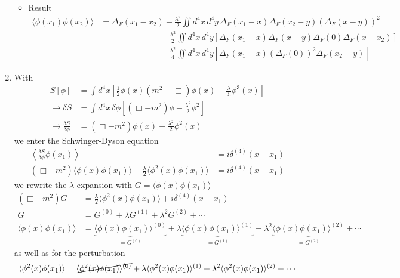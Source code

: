 \documentclass[10pt,a4paper]{article}
\theoremstyle{definition}
\begin{document}
\begin{enumerate}[1.]
\begin{itemize}
\item Result
\begin{align}
\langle\phi(x_1)\phi(x_2)\rangle&=
\Delta_F(x_1-x_2)
-\frac{\lambda^2}{2}\iint d^4x\,d^4y\,\Delta_F(x_1-x)\Delta_F(x_2-y)(\Delta_F(x-y))^2\\
&\qquad\qquad\qquad\quad- \frac{\lambda^2}{2}\iint d^4x\,d^4y \left[\Delta_F(x_1-x)\Delta_F(x-y)\Delta_F(0)\Delta_F(x-x_2)\right]\\
&\qquad\qquad\qquad\quad- \frac{\lambda^2}{4}\iint d^4x\,d^4y \left[\Delta_F(x_1-x)(\Delta_F(0))^2\Delta_F(x_2-y)\right]
\end{align}
\end{itemize}


\item With
\begin{align}
S[\phi] &= \int d^4x \left[ \frac{1}{2} \phi(x)(m^2-\Box)\phi(x) - \frac{\lambda}{3!} \phi^3(x) \right]\\
\rightarrow \delta S&=\int d^4x\,\delta\phi\left[(\Box-m^2)\phi-\frac{\lambda^2}{2}\phi^2\right]\\
\rightarrow \frac{\delta S}{\delta\phi}&=(\Box-m^2)\phi(x)-\frac{\lambda^2}{2}\phi^2(x)
\end{align}
we enter the Schwinger-Dyson equation
\begin{align}
\left<\frac{\delta S}{\delta\phi}\phi(x_1)\right>
&=i\delta^{(4)}(x-x_1)\\
(\Box-m^2)\langle\phi(x)\phi(x_1)\rangle-
\frac{\lambda}{2}\langle\phi^2(x)\phi(x_1)\rangle
&=i\delta^{(4)}(x-x_1)
\end{align}
we rewrite the $\lambda$ expansion with $G=\langle\phi(x)\phi(x_1)\rangle$
\begin{align}
(\Box-m^2)G&=
\frac{\lambda}{2}\langle\phi^2(x)\phi(x_1)\rangle
+i\delta^{(4)}(x-x_1)\\
G 
&= G^{(0)} + \lambda G^{(1)} + \lambda^2 G^{(2)} + \cdots\\
\langle\phi(x)\phi(x_1)\rangle
&=\underbrace{\langle\phi(x)\phi(x_1)\rangle^{(0)}}_{=G^{(0)}}
+\lambda\underbrace{\langle\phi(x)\phi(x_1)\rangle^{(1)}}_{=G^{(1)}}
+\lambda^2\underbrace{\langle\phi(x)\phi(x_1)\rangle^{(2)}}_{=G^{(2)}}+\cdots
\end{align}
as well as for the perturbation
\begin{align}
\langle\phi^2(x)\phi(x_1)\rangle
& = \cancel{\langle\phi^2(x)\phi(x_1)\rangle^{(0)}}+\lambda\langle\phi^2(x)\phi(x_1)\rangle^{(1)}+\lambda^2\langle\phi^2(x)\phi(x_1)\rangle^{(2)}+ \cdots\\

\end{align}
\end{enumerate}
\end{document}
